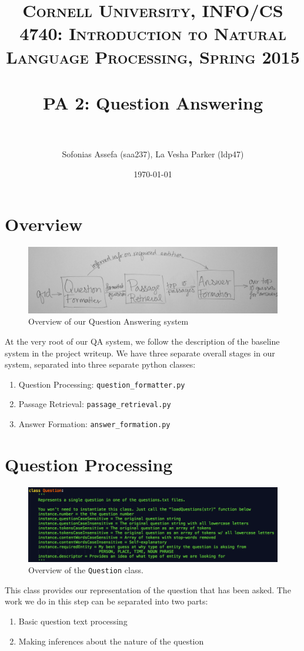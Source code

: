 \documentclass{article}
\title{	
\normalfont \normalsize 
\textsc{Cornell University, INFO/CS 4740: Introduction to Natural Language Processing, Spring 2015} \\
\horrule{0.5pt} \\[0.4cm]
\huge PA 2: Question Answering \\ 
\horrule{2pt} \\[0.5cm]
}
\author{Sofonias Assefa (saa237), La Vesha Parker (ldp47)}
\date{\normalsize\today}
\begin{document}
\maketitle

\section{Overview}
\begin{figure}[h]
    \centering
    \includegraphics[width=1.0\textwidth]{images/diagram.jpg}
    \caption{Overview of our Question Answering system}
\end{figure}
At the very root of our QA system, we follow the description of the baseline system in the project writeup. We have three separate overall stages in our system, separated into three separate python classes:
\begin{enumerate}
\item Question Processing: \texttt{question\_formatter.py}
\item Passage Retrieval: \texttt{passage\_retrieval.py}
\item Answer Formation: \texttt{answer\_formation.py}
\end{enumerate}

\section{Question Processing}
\begin{figure}[h]
    \centering
    \includegraphics[width=1.0\textwidth]{images/question.png}
    \caption{Overview of the \texttt{Question} class.}
\end{figure}

This class provides our representation of the question that has been asked. The work we do in this step can be separated into two parts:
\begin{enumerate}
\item Basic question text processing
\item Making inferences about the nature of the question
\end{enumerate}
\end{document}
